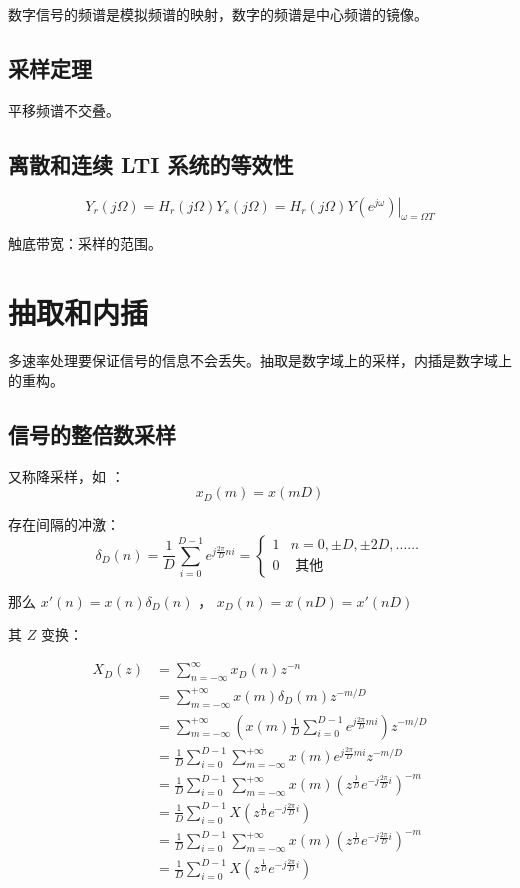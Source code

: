 \documentclass[cn,11pt,chinese,black,simple]{elegantbook}
\begin{document}
数字信号的频谱是模拟频谱的映射，数字的频谱是中心频谱的镜像。

\subsection{采样定理}

平移频谱不交叠。

\subsection{离散和连续 LTI 系统的等效性}

\[Y_{r}(j \Omega)=H_{r}(j \Omega) Y_{s}(j \Omega)=\left.H_{r}(j \Omega) Y\left(e^{j \omega}\right)\right|_{\omega=\Omega T}\]

触底带宽：采样的范围。

\section{抽取和内插}

多速率处理要保证信号的信息不会丢失。抽取是数字域上的采样，内插是数字域上的重构。

\subsection{信号的整倍数采样}

又称降采样，如  ： \[x_D(m) = x(mD)\]  


存在间隔的冲激： \[\delta_{D}(n)=\frac{1}{D} \sum_{i=0}^{D-1} e^{j \frac{2 \pi}{D} n i}=\left\{\begin{array}{ll}
    1 & n=0, \pm D, \pm 2 D, \ldots \ldots \\
    0 & \text { 其他 }
    \end{array}\right.\]

那么 \(x'(n) = x(n) \delta_D(n)\)  ， \(x_D(n) = x(nD) = x'(nD)\) 

其 \(Z\) 变换：

\[\begin{aligned}
    X_D(z) &= \sum_{n=-\infty}^\infty x_D(n) z^{-n} \\ 
    &=\sum_{m=-\infty}^{+\infty} x(m) \delta_{D}(m) z^{-m / D} \\
    &=\sum_{m=-\infty}^{+\infty}\left(x(m) \frac{1}{D} \sum_{i=0}^{D-1} e^{j \frac{2 \pi}{D} m i}\right) z^{-m / D} \\
    &=\frac{1}{D} \sum_{i=0}^{D-1} \sum_{m=-\infty}^{+\infty} x(m) e^{j \frac{2 \pi}{D} m i} z^{-m / D} \\
    &=\frac{1}{D} \sum_{i=0}^{D-1} \sum_{m=-\infty}^{+\infty} x(m)\left(z^{\frac{1}{D}} e^{-j \frac{2 \pi}{D} i}\right)^{-m} \\
    &=\frac{1}{D} \sum_{i=0}^{D-1} X\left(z^{\frac{1}{D}} e^{-j \frac{2 \pi}{D} i}\right) \\
    &=\frac{1}{D} \sum_{i=0}^{D-1} \sum_{m=-\infty}^{+\infty} x(m)\left(z^{\frac{1}{D}} e^{-j \frac{2 \pi}{D} i}\right)^{-m} \\
    &=\frac{1}{D} \sum_{i=0}^{D-1} X\left(z^{\frac{1}{D}} e^{-j \frac{2 \pi}{D} i}\right)
\end{aligned}\]
\end{document}
